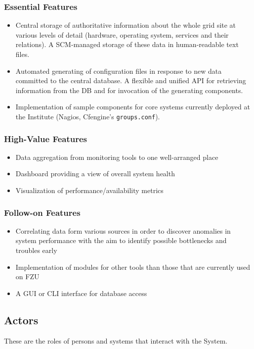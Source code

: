 \documentclass[12pt]{article}
\begin{document}
\subsubsection{Essential Features}
\begin{itemize}
	\item Central storage of authoritative information about the whole grid site
        at various levels of detail (hardware, operating system, services and
        their relations).  A SCM-managed storage of these data in human-readable
        text files.
	\item Automated generating of configuration files in response to new data
        committed to the central database.  A flexible and unified API for
        retrieving information from the DB and for invocation of the generating
        components.
  \item Implementation of sample components for core systems currently
        deployed at the Institute (Nagios, Cfengine's {\tt groups.conf}).
\end{itemize}

\subsubsection{High-Value Features}
\begin{itemize}
	  \item Data aggregation from monitoring tools to one well-arranged place
    \item Dashboard providing a view of overall system health
    \item Visualization of performance/availability metrics
\end{itemize}

\subsubsection{Follow-on Features}
\begin{itemize}
    \item Correlating data form various sources in order to discover anomalies
        in system performance with the aim to identify possible bottlenecks and
        troubles early
	  \item Implementation of modules for other tools than those that are currently used on FZU
    \item A GUI or CLI interface for database access
\end{itemize}

\subsection{Actors}
These are the roles of persons and systems that interact with the System.
\end{document}
